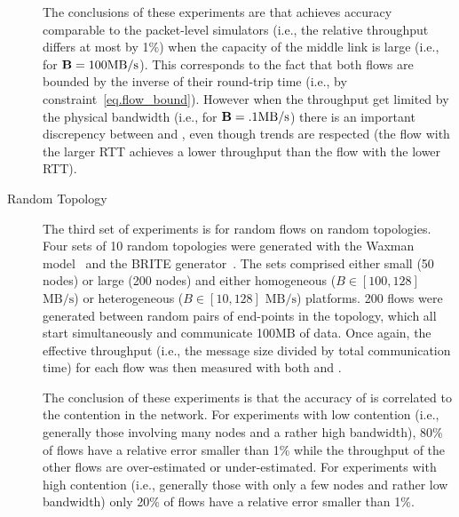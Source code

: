 \documentclass{sig-alternate}
\def\ie{i.e.,\xspace}
\def\MBps{\ensuremath{\text{MB}/\text{s}}\xspace}%
\def\MB{\ensuremath{\text{MB}}\xspace}%
\begin{document}
\begin{description}
  The conclusions of these experiments are that \simgrid achieves
  accuracy comparable to the packet-level simulators (\ie the
  relative throughput differs at most by 1\%) when the capacity of the
  middle link is large (\ie for $\BDogbone = 100\MBps$). This
  corresponds to the fact that both flows are bounded by the
  inverse of their round-trip time (\ie by
  constraint~\eqref{eq.flow_bound}). However when the throughput get
  limited by the physical bandwidth (\ie for $\BDogbone = .1 \MBps$)
  there is an important discrepency between \simgrid and \gtnets, even
  though trends are respected (the flow with the larger RTT achieves a
  lower throughput than the flow with the lower RTT).

\item[Random Topology] The third set of experiments is for random
  flows on random topologies. Four sets of 10 random topologies were
  generated with the Waxman model~\cite{Waxman88} and the BRITE
  generator~\cite{brite}. The sets comprised either small (50 nodes)
  or large (200 nodes) and either homogeneous ($B\in [100,128]$ \MBps)
  or heterogeneous ($B\in [10,128]$ \MBps) platforms. 200 flows were
  generated between random pairs of end-points in the topology, which
  all start simultaneously and communicate 100\MB of data. Once again,
  the effective throughput (\ie the message size divided by total
  communication time) for each flow was then measured with both
  \simgrid and \gtnets.

  The conclusion of these experiments is that the accuracy of \simgrid
  is correlated to the contention in the network. For experiments with
  low contention (\ie generally those involving many nodes
  and a rather high bandwidth), 80\% of flows have a relative error
  smaller than 1\% while the throughput of the other flows are
  over-estimated or under-estimated. For experiments with high
  contention (\ie generally those with only a few nodes and rather
  low bandwidth) only 20\% of flows have a relative error
  smaller than 1\%.
\end{description}
\end{document}
